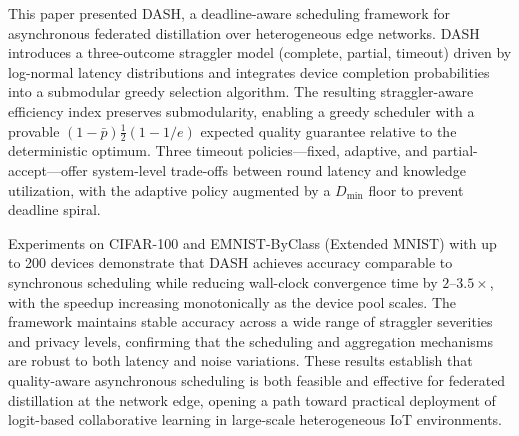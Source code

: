 \documentclass[a4paper,fleqn]{cas-dc}
\begin{document}
	This paper presented DASH, a deadline-aware scheduling framework
	for asynchronous federated distillation over heterogeneous edge
	networks.  DASH introduces a three-outcome straggler model
	(complete, partial, timeout) driven by log-normal latency
	distributions and integrates device completion probabilities into a
	submodular greedy selection algorithm.  The resulting straggler-aware
	efficiency index preserves submodularity, enabling a greedy
	scheduler with a provable
	$(1-\bar{p})\tfrac{1}{2}(1-1/e)$ expected quality guarantee relative
	to the deterministic optimum.  Three timeout policies---fixed,
	adaptive, and partial-accept---offer system-level trade-offs between
	round latency and knowledge utilization, with the adaptive policy
	augmented by a $D_{\min}$ floor to prevent deadline spiral.
	
	Experiments on CIFAR-100 and EMNIST-ByClass (Extended MNIST) with up to 200 devices
	demonstrate that DASH achieves accuracy comparable to synchronous
	scheduling while reducing wall-clock convergence time by
	$2$--$3.5\times$, with the speedup increasing monotonically as the
	device pool scales.  The framework maintains stable accuracy across
	a wide range of straggler severities and privacy levels, confirming
	that the scheduling and aggregation mechanisms are robust to both
	latency and noise variations.  These results establish that
	quality-aware asynchronous scheduling is both feasible and effective
	for federated distillation at the network edge, opening a path
	toward practical deployment of logit-based collaborative learning
	in large-scale heterogeneous IoT environments.
	
	
	\printcredits
	
	
	
	
	
	
\end{document}
